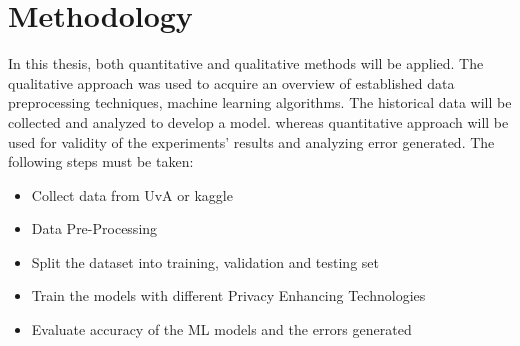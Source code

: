 \section{Methodology}
\label{sec:methodology}
In this thesis, both quantitative and qualitative methods will be applied. The qualitative approach was used to acquire an overview of established data preprocessing techniques, machine learning algorithms.
The historical data will be collected and analyzed to develop a model. whereas quantitative approach will be used for validity of the experiments’ results and analyzing error generated.
The following steps must be taken:
\begin{itemize}
    \item Collect data from UvA or kaggle
    \item Data Pre-Processing 
    \item Split the dataset into training, validation and testing set
    \item Train the models with different Privacy Enhancing Technologies
    \item Evaluate accuracy of the ML models and the errors generated 
\end{itemize}